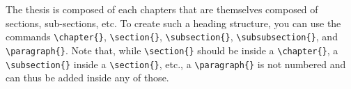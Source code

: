 \documentclass[11pt,twoside,openright]{report}
\begin{document}
The thesis is composed of each chapters that are themselves composed of sections, sub-sections, etc.
To create such a heading structure, you can use the commands \verb|\chapter{}|, \verb|\section{}|, \verb|\subsection{}|, \verb|\subsubsection{}|, and \verb|\paragraph{}|. 
Note that, while \verb|\section{}| should be inside a \verb|\chapter{}|, a \verb|\subsection{}| inside a \verb|\section{}|, etc., a \verb|\paragraph{}| is not numbered and can thus be added inside any of those.
\end{document}
